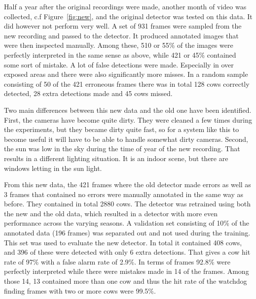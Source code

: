 \documentclass{cta-author}
\begin{document}
Half a year after the original recordings were made, another month of video was collected, c.f
Figure~\ref{fig:new}, and the original detector was tested on this data. It did however not perform very
well. A set of 931 frames were sampled from the new recording and passed to the detector. It produced
annotated images that were then inspected manually. Among these, 510 or 55\% of the images were perfectly
interpreted in the same sense as above, while 421 or 45\% contained some sort of mistake.
A lot of false detections were made. Especially in over exposed areas and there were also significantly
more misses. In a random sample consisting of 50 of the 421 erroneous frames there was in total 128 cows correctly detected, 28 extra detections made and 45 cows missed.

Two main differences between this new data and the old one have been identified.
First, the cameras have become quite dirty. They were cleaned a few times during the experiments, but they
became dirty quite fast, so for a system like this to become useful it will have to be able to handle
somewhat dirty cameras. Second, the sun was low in the sky during  the time of year of the new recording.
That results in a different lighting situation. It is an indoor scene, but there are windows letting in the
sun light.

From this new data, the 421 frames where the old detector made errors as well as 3 frames that contained no
errors were manually annotated in the same way as before. They contained in total 2880 cows. The detector was
retrained using both the new and the old data, which resulted in a detector with more even performance across
the varying seasons. A validation set consisting of 10\% of the annotated data (196 frames) was separated
out and not used during the training. This set was used to evaluate the new detector. In total it contained
408 cows, and 396 of these were detected with only 6 extra detections. That gives a cow hit rate of 97\%
with a false alarm rate of 2.9\%. In terms of frames 92.8\% were perfectly interpreted while there were
mistakes made in 14 of the frames. Among those 14, 13 contained more than one cow and thus the hit rate of
the watchdog finding frames with two or more cows were 99.5\%.
\end{document}
